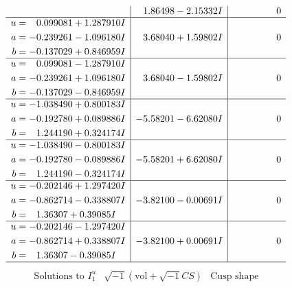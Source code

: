 \documentclass[1p]{elsarticle_modified}
\theoremstyle{definition}
\newcommand{\I}{\sqrt{-1}}
\begin{document}
$$\begin{array}{c|c|c}
 & \phantom{-}1.86498 - 2.15332 I & \phantom{-0.000000 } 0 \\ \hline\begin{aligned}
u &= \phantom{-}0.099081 + 1.287910 I \\
a &= -0.239261 - 1.096180 I \\
b &= -0.137029 + 0.846959 I\end{aligned}
 & \phantom{-}3.68040 + 1.59802 I & \phantom{-0.000000 } 0 \\ \hline\begin{aligned}
u &= \phantom{-}0.099081 - 1.287910 I \\
a &= -0.239261 + 1.096180 I \\
b &= -0.137029 - 0.846959 I\end{aligned}
 & \phantom{-}3.68040 - 1.59802 I & \phantom{-0.000000 } 0 \\ \hline\begin{aligned}
u &= -1.038490 + 0.800183 I \\
a &= -0.192780 + 0.089886 I \\
b &= \phantom{-}1.244190 + 0.324174 I\end{aligned}
 & -5.58201 - 6.62080 I & \phantom{-0.000000 } 0 \\ \hline\begin{aligned}
u &= -1.038490 - 0.800183 I \\
a &= -0.192780 - 0.089886 I \\
b &= \phantom{-}1.244190 - 0.324174 I\end{aligned}
 & -5.58201 + 6.62080 I & \phantom{-0.000000 } 0 \\ \hline\begin{aligned}
u &= -0.202146 + 1.297420 I \\
a &= -0.862714 - 0.338807 I \\
b &= \phantom{-}1.36307 + 0.39085 I\end{aligned}
 & -3.82100 - 0.00691 I & \phantom{-0.000000 } 0 \\ \hline\begin{aligned}
u &= -0.202146 - 1.297420 I \\
a &= -0.862714 + 0.338807 I \\
b &= \phantom{-}1.36307 - 0.39085 I\end{aligned}
 & -3.82100 + 0.00691 I & \phantom{-0.000000 } 0\\
 \hline 
 \end{array}$$\newpage$$\begin{array}{c|c|c}  
\text{Solutions to }I^u_{1}& \I (\text{vol} + \sqrt{-1}CS) & \text{Cusp shape}\\

\end{array}$$
\end{document}
